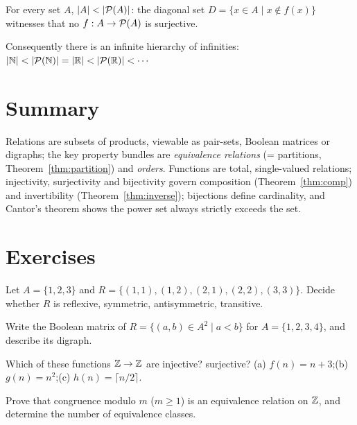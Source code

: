 \begin{theorem}[Cantor]\label{thm:cantor}
For every set $A$, $|A| < |\mathcal{P}(A)|$: the diagonal set
$D = \{x \in A \mid x \notin f(x)\}$ witnesses that no
$f : A \to \mathcal{P}(A)$ is surjective.
\end{theorem}

Consequently there is an infinite hierarchy of infinities:
$|\mathbb{N}| < |\mathcal{P}(\mathbb{N})| = |\mathbb{R}| < |\mathcal{P}(\mathbb{R})| < \cdots$

\section{Summary}

Relations are subsets of products, viewable as pair-sets, Boolean matrices or
digraphs; the key property bundles are \emph{equivalence relations}
(= partitions, Theorem~\ref{thm:partition}) and \emph{orders}. Functions are
total, single-valued relations; injectivity, surjectivity and bijectivity
govern composition (Theorem~\ref{thm:comp}) and invertibility
(Theorem~\ref{thm:inverse}); bijections define cardinality, and Cantor's
theorem shows the power set always strictly exceeds the set.

\section*{Exercises}

\begin{exercise}{\easy}
Let $A = \{1,2,3\}$ and $R = \{(1,1),(1,2),(2,1),(2,2),(3,3)\}$. Decide
whether $R$ is reflexive, symmetric, antisymmetric, transitive.
\end{exercise}

\begin{exercise}{\easy}
Write the Boolean matrix of $R = \{(a,b) \in A^2 \mid a < b\}$ for
$A = \{1,2,3,4\}$, and describe its digraph.
\end{exercise}

\begin{exercise}{\easy}
Which of these functions $\mathbb{Z} \to \mathbb{Z}$ are injective? surjective?
(a) $f(n) = n + 3$;\quad (b) $g(n) = n^2$;\quad (c) $h(n) = \lceil n/2
\rceil$.
\end{exercise}

\begin{exercise}{\medium}
Prove that congruence modulo $m$ ($m \geq 1$) is an equivalence relation on
$\mathbb{Z}$, and determine the number of equivalence classes.
\end{exercise}

